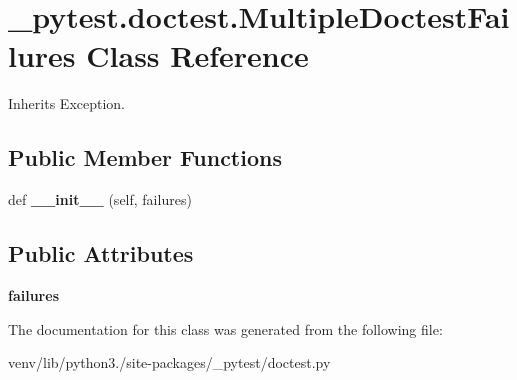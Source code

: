 \hypertarget{class__pytest_1_1doctest_1_1_multiple_doctest_failures}{}\section{\+\_\+pytest.\+doctest.\+Multiple\+Doctest\+Failures Class Reference}
\label{class__pytest_1_1doctest_1_1_multiple_doctest_failures}


Inherits Exception.

\subsection*{Public Member Functions}
\begin{DoxyCompactItemize}
\item 
\mbox{\label{class__pytest_1_1doctest_1_1_multiple_doctest_failures_a0a14b147a4b06bddb247c36bdbbf3500}} 
def {\bfseries \+\_\+\+\_\+init\+\_\+\+\_\+} (self, failures)
\end{DoxyCompactItemize}
\subsection*{Public Attributes}
\begin{DoxyCompactItemize}
\item 
\mbox{\label{class__pytest_1_1doctest_1_1_multiple_doctest_failures_a0388fd8a02bec4b1ac9fb1d1a5a035fd}} 
{\bfseries failures}
\end{DoxyCompactItemize}


The documentation for this class was generated from the following file\+:\begin{DoxyCompactItemize}
\item 
venv/lib/python3./site-\/packages/\+\_\+pytest/doctest.\+py\end{DoxyCompactItemize}
